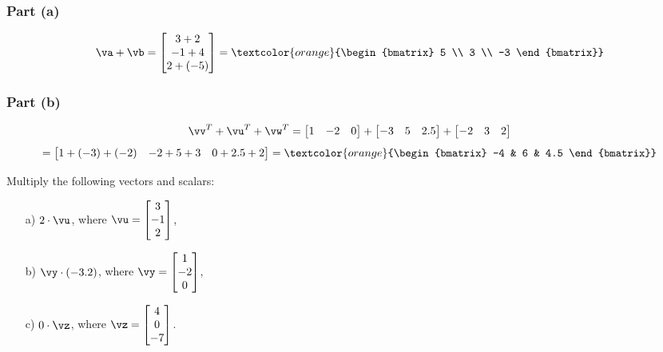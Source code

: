 \begin{sol} 
    \subsubsection*{Part (a)}

    \[
    \va + \vb = \begin{bmatrix} 3+2 \\ -1+4 \\ 2+(-5) \end{bmatrix} = \textcolor{orange}{\begin{bmatrix} 5 \\ 3 \\ -3 \end{bmatrix}}
    \]
    
    \subsubsection*{Part (b)}
    
    \[
    \vv^T + \vu^T + \vw^T = \begin{bmatrix} 1 & -2 & 0 \end{bmatrix} + \begin{bmatrix} -3 & 5 & 2.5 \end{bmatrix} + \begin{bmatrix} -2 & 3 & 2 \end{bmatrix}
    \]
    \[
    = \begin{bmatrix} 1+(-3)+(-2) & -2+5+3 & 0+2.5+2 \end{bmatrix} = \textcolor{orange}{\begin{bmatrix} -4 & 6 & 4.5 \end{bmatrix}}
    \]
\end{sol}


\begin{problem}%
    Multiply the following vectors and scalars:

    \begin{enumerate}
        \item[a) ] $2 \cdot \vu$,  where $\vu= \begin{bmatrix} 3 \\ -1 \\ 2 \end{bmatrix} $,
        
        \item[b) ] $ \vy \cdot (-3.2)$, where $\vy = \begin{bmatrix} 1 \\ -2 \\ 0 \end{bmatrix}$,
        
        \item[c) ] $0 \cdot \vz$, where $\vz = \begin{bmatrix}4 \\ 0 \\ -7 \end{bmatrix}$.
    \end{enumerate}
\end{problem}

